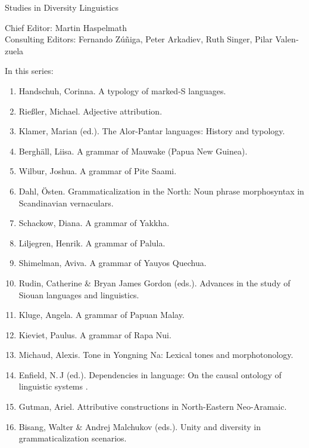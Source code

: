 {\large Studies in Diversity Linguistics}

\bigskip

Chief Editor: Martin Haspelmath \\
Consulting Editors: Fernando Zúñiga, Peter Arkadiev, Ruth Singer, Pilar Valen­zuela

\bigskip

In this series:

\begin{enumerate}
\item Handschuh, Corinna. A typology of marked-S languages.
\item Rießler, Michael. Adjective attribution.
\item Klamer, Marian (ed.). The Alor-Pantar languages: History and typology.
\item Berghäll, Liisa. A grammar of Mauwake (Papua New Guinea).
\item Wilbur, Joshua. A grammar of Pite Saami.
\item Dahl, Östen. Grammaticalization in the North: Noun phrase morphosyntax in Scandinavian vernaculars.
\item Schackow, Diana.    A grammar of Yakkha.
\item Liljegren, Henrik. A grammar of Palula.
\item Shimelman, Aviva. A grammar of Yauyos Quechua. 
\item Rudin, Catherine \& Bryan James Gordon (eds.). Advances in the study of Siouan languages and linguistics.
\item Kluge, Angela. A grammar of Papuan Malay. 
\item Kieviet, Paulus. A grammar of Rapa Nui. 
\item Michaud, Alexis. Tone in Yongning Na: Lexical tones and morphotonology.
\item Enfield, N.\,J (ed.).  Dependencies in language: On the causal ontology of linguistic systems .
\item Gutman, Ariel. Attributive constructions in North-Eastern Neo-Aramaic.
\item Bisang, Walter \& Andrej Malchukov (eds.). Unity and diversity in grammaticalization scenarios.
 
\end{enumerate}



